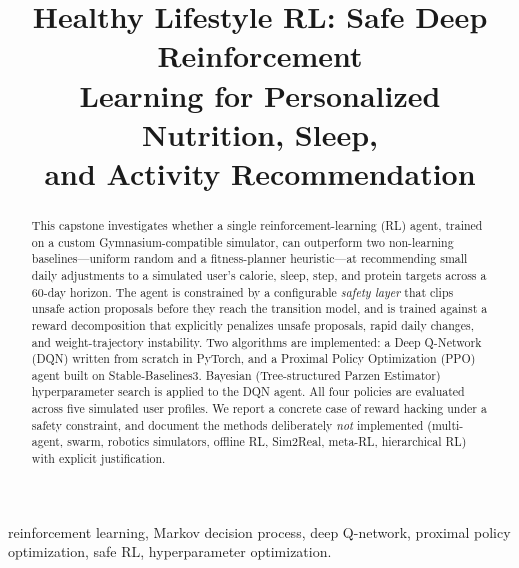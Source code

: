 \documentclass[conference]{IEEEtran}
\begin{document}
\title{Healthy Lifestyle RL: Safe Deep Reinforcement\\
Learning for Personalized Nutrition, Sleep,\\
and Activity Recommendation}

\author{
}

\maketitle

\begin{abstract}
This capstone investigates whether a single reinforcement-learning (RL)
agent, trained on a custom Gymnasium-compatible simulator, can outperform
two non-learning baselines---uniform random and a fitness-planner
heuristic---at recommending small daily adjustments to a simulated user's
calorie, sleep, step, and protein targets across a 60-day horizon. The agent
is constrained by a configurable \emph{safety layer} that clips unsafe action
proposals before they reach the transition model, and is trained against a
reward decomposition that explicitly penalizes unsafe proposals, rapid daily
changes, and weight-trajectory instability. Two algorithms are implemented: a
Deep Q-Network (DQN) written from scratch in PyTorch, and a Proximal Policy
Optimization (PPO) agent built on Stable-Baselines3. Bayesian (Tree-structured
Parzen Estimator) hyperparameter search is applied to the DQN agent. All four
policies are evaluated across five simulated user profiles. We report a
concrete case of reward hacking under a safety constraint, and document the
methods deliberately \emph{not} implemented (multi-agent, swarm, robotics
simulators, offline RL, Sim2Real, meta-RL, hierarchical RL) with explicit
justification.
\end{abstract}

\begin{IEEEkeywords}
reinforcement learning, Markov decision process, deep Q-network, proximal
policy optimization, safe RL, hyperparameter optimization.
\end{IEEEkeywords}
\end{document}
